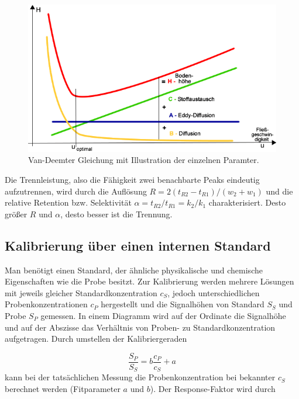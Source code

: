       \begin{figure}[H]
        \includegraphics[scale=0.4, center]{images/VanDeemterGleichung.png} 
        \caption[Van-Deemter Gleichung, Quelle:  (Zugegriffen am 07.01.2020)]{Van-Deemter Gleichung mit Illustration der einzelnen Paramter.}
        \label{fig:VanDeemterGleichung}
      \end{figure}    
    
    Die Trennleistung, also die Fähigkeit zwei benachbarte Peaks eindeutig aufzutrennen, wird durch die Auflösung $R = 2\left(t_{R2} - t_{R1}\right) / \left(w_2 + w_1\right)$ und die relative Retention bzw. Selektivität $\alpha = t_{R2} / t_{R1} = k_2 / k_1$ charakterisiert. Desto größer $R$ und $\alpha$, desto  besser ist die Trennung. \citep{Versuchsvorschrift}
    
  \subsection{Kalibrierung über einen internen Standard}
  
    Man benötigt einen Standard, der ähnliche physikalische und chemische Eigenschaften wie die Probe besitzt. Zur Kalibrierung werden mehrere Lösungen mit jeweils gleicher Standardkonzentration $c_{S}$, jedoch unterschiedlichen Probenkonzentrationen $c_{P}$ hergestellt und die Signalhöhen von Standard $S_{S}$ und Probe $S_{P}$ gemessen. In einem Diagramm wird auf der Ordinate die Signalhöhe und auf der Abszisse das Verhältnis von Proben- zu Standardkonzentration aufgetragen. Durch umstellen der Kalibriergeraden 
    
      \begin{equation}
        \frac{S_{P}}{S_{S}} = b \frac{c_{P}}{c_{S}} + a
      \end{equation}
    kann bei der tatsächlichen Messung die Probenkonzentration bei bekannter $c_S$ berechnet werden (Fitparameter $a$ und $b$). Der Response-Faktor wird durch
    
